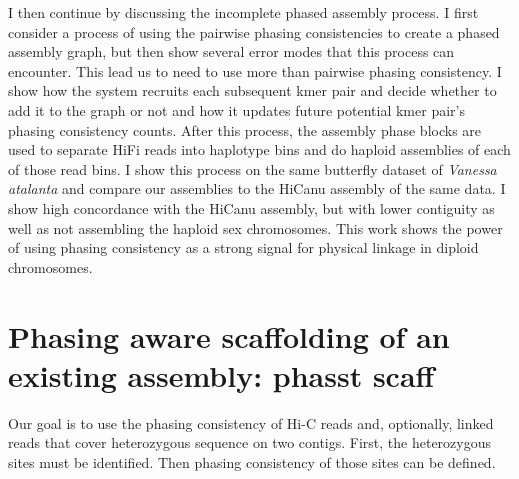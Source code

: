 \par{
I then continue by discussing the incomplete phased assembly process. I first consider a process of using the pairwise phasing consistencies to create a phased assembly graph, but then show several error modes that this process can encounter. This lead us to need to use more than pairwise phasing consistency. I show how the system recruits each subsequent kmer pair and decide whether to add it to the graph or not and how it updates future potential kmer pair's phasing consistency counts. After this process, the assembly phase blocks are used to separate HiFi reads into haplotype bins and do haploid assemblies of each of those read bins. I show this process on the same butterfly dataset of \textit{Vanessa atalanta} and compare our assemblies to the HiCanu assembly of the same data. I show high concordance with the HiCanu assembly, but with lower contiguity as well as not assembling the haploid sex chromosomes. This work shows the power of using phasing consistency as a strong signal for physical linkage in diploid chromosomes.
}


\section{Phasing aware scaffolding of an existing assembly: phasst scaff}

\par{
Our goal is to use the phasing consistency of Hi-C reads and, optionally, linked reads that cover heterozygous sequence on two contigs. First, the heterozygous sites must be identified. Then phasing consistency of those sites can be defined.
}

